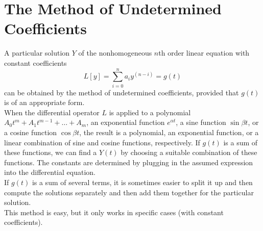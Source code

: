 \section{The Method of Undetermined Coefficients}
    A particular solution $Y$ of the nonhomogeneous $n$th order linear equation with constant coefficients
    $$L[y] = \sum_{i=0}^n a_iy^{(n - i)} = g(t)$$
    can be obtained by the method of undetermined coefficients, provided that $g(t)$ is of an appropriate form.
    \\
    When the differential operator $L$ is applied to a polynomial $A_0t^m + A_1t^{m-1} + \dots + A_m$, an exponential function $e^{\alpha t}$, a sine function $\sin \beta t$, or a cosine function $\cos \beta t$, the result is a polynomial, an exponential function, or a linear combination of sine and cosine functions, respectively. If $g(t)$ is a sum of these functions, we can find a $Y(t)$ by choosing a suitable combination of these functions. The constants are determined by plugging in the assumed expression into the differential equation.
    \\
    If $g(t)$ is a sum of several terms, it is sometimes easier to split it up and then compute the solutions separately and then add them together for the particular solution.
    \\
    This method is easy, but it only works in specific cases (with constant coefficients).